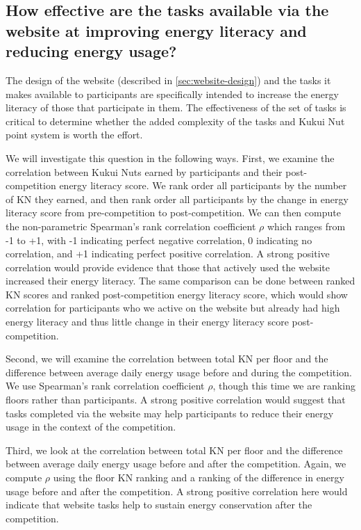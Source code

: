 \subsection[How effective were the tasks available via the website?]{How effective are the tasks available via the website at improving energy literacy and reducing energy usage?}
\label{sec:task-effectiveness}

The design of the website (described in \autoref{sec:website-design}) and the tasks it makes available to participants are specifically intended to increase the energy literacy of those that participate in them. The effectiveness of the set of tasks is critical to determine whether the added complexity of the tasks and Kukui Nut point system is worth the effort.

We will investigate this question in the following ways. First, we examine the correlation between Kukui Nuts earned by participants and their post-competition energy literacy score. We rank order all participants by the number of KN they earned, and then rank order all participants by the change in energy literacy score from pre-competition to post-competition. We can then compute the non-parametric Spearman's rank correlation coefficient $\rho$ which ranges from -1 to +1, with -1 indicating perfect negative correlation, 0 indicating no correlation, and +1 indicating perfect positive correlation. A strong positive correlation would provide evidence that those that actively used the website increased their energy literacy. The same comparison can be done between ranked KN scores and ranked post-competition energy literacy score, which would show correlation for participants who we active on the website but already had high energy literacy and thus little change in their energy literacy score post-competition.

Second, we will examine the correlation between total KN per floor and the difference between average daily energy usage before and during the competition. We use Spearman's rank correlation coefficient $\rho$, though this time we are ranking floors rather than participants. A strong positive correlation would suggest that tasks completed via the website may help participants to reduce their energy usage in the context of the competition.

Third, we look at the correlation between total KN per floor and the difference between average daily energy usage before and after the competition. Again, we compute $\rho$ using the floor KN ranking and a ranking of the difference in energy usage before and after the competition. A strong positive correlation here would indicate that website tasks help to sustain energy conservation after the competition.

